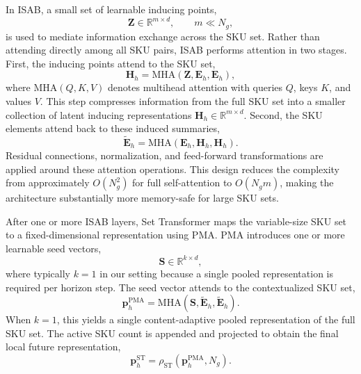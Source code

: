 \documentclass[12pt]{article}
\begin{document}
In ISAB, a small set of learnable inducing points,
\begin{equation}
  \mathbf{Z}
  \in
  \mathbb{R}^{m \times d},
  \qquad
  m \ll N_g,
\end{equation}
is used to mediate information exchange across the SKU set. Rather than attending directly among all SKU pairs, ISAB performs attention in two stages. First, the inducing points attend to the SKU set,
\begin{equation}
  \mathbf{H}_h
  =
  \mathrm{MHA}(\mathbf{Z}, \mathbf{E}_h, \mathbf{E}_h),
\end{equation}
where $\mathrm{MHA}(Q,K,V)$ denotes multihead attention with queries $Q$, keys $K$, and values $V$. This step compresses information from the full SKU set into a smaller collection of latent inducing representations $\mathbf{H}_h \in \mathbb{R}^{m \times d}$. Second, the SKU elements attend back to these induced summaries,
\begin{equation}
  \tilde{\mathbf{E}}_h
  =
  \mathrm{MHA}(\mathbf{E}_h, \mathbf{H}_h, \mathbf{H}_h).
\end{equation}
Residual connections, normalization, and feed-forward transformations are applied around these attention operations. This design reduces the complexity from approximately $O(N_g^2)$ for full self-attention to $O(N_g m)$, making the architecture substantially more memory-safe for large SKU sets.

After one or more ISAB layers, Set Transformer maps the variable-size SKU set to a fixed-dimensional representation using PMA. PMA introduces one or more learnable seed vectors,
\begin{equation}
  \mathbf{S}
  \in
  \mathbb{R}^{k \times d},
\end{equation}
where typically $k=1$ in our setting because a single pooled representation is required per horizon step. The seed vector attends to the contextualized SKU set,
\begin{equation}
  \mathbf{p}^{\mathrm{PMA}}_h
  =
  \mathrm{MHA}(\mathbf{S}, \tilde{\mathbf{E}}_h, \tilde{\mathbf{E}}_h).
\end{equation}
When $k=1$, this yields a single content-adaptive pooled representation of the full SKU set. The active SKU count is appended and projected to obtain the final local future representation,
\begin{equation}
  \mathbf{p}^{\mathrm{ST}}_h
  =
  \rho_{\mathrm{ST}}
  \left(
  \mathbf{p}^{\mathrm{PMA}}_h,
  N_g
  \right).
\end{equation}
\end{document}
